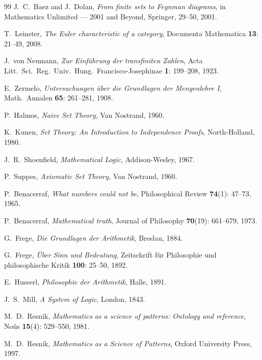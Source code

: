 \documentclass[12pt]{article}
\theoremstyle{definition}
\theoremstyle{remark}
\begin{document}
\begin{thebibliography}{99}
J.~C.~Baez and J.~Dolan,
\emph{From finite sets to Feynman diagrams},
in Mathematics Unlimited --- 2001 and Beyond, Springer, 29--50, 2001.

T.~Leinster,
\emph{The Euler characteristic of a category},
Documenta Mathematica \textbf{13}: 21--49, 2008.


J.~von Neumann,
\emph{Zur Einf\"uhrung der transfiniten Zahlen},
Acta Litt.\ Sci.\ Reg.\ Univ.\ Hung.\ Francisco-Josephinae \textbf{1}: 199--208, 1923.

E.~Zermelo,
\emph{Untersuchungen \"uber die Grundlagen der Mengenlehre I},
Math.\ Annalen \textbf{65}: 261--281, 1908.

P.~Halmos,
\emph{Naive Set Theory},
Van Nostrand, 1960.

K.~Kunen,
\emph{Set Theory: An Introduction to Independence Proofs},
North-Holland, 1980.

J.~R.~Shoenfield,
\emph{Mathematical Logic},
Addison-Wesley, 1967.

P.~Suppes,
\emph{Axiomatic Set Theory},
Van Nostrand, 1960.


P.~Benacerraf,
\emph{What numbers could not be},
Philosophical Review \textbf{74}(1): 47--73, 1965.

P.~Benacerraf,
\emph{Mathematical truth},
Journal of Philosophy \textbf{70}(19): 661--679, 1973.

G.~Frege,
\emph{Die Grundlagen der Arithmetik},
Breslau, 1884.

G.~Frege,
\emph{\"Uber Sinn und Bedeutung},
Zeitschrift f\"ur Philosophie und philosophische Kritik \textbf{100}: 25--50, 1892.

E.~Husserl,
\emph{Philosophie der Arithmetik},
Halle, 1891.

J.~S.~Mill,
\emph{A System of Logic},
London, 1843.

M.~D.~Resnik,
\emph{Mathematics as a science of patterns: Ontology and reference},
No\^us \textbf{15}(4): 529--550, 1981.

M.~D.~Resnik,
\emph{Mathematics as a Science of Patterns},
Oxford University Press, 1997.


\end{thebibliography}
\end{document}
